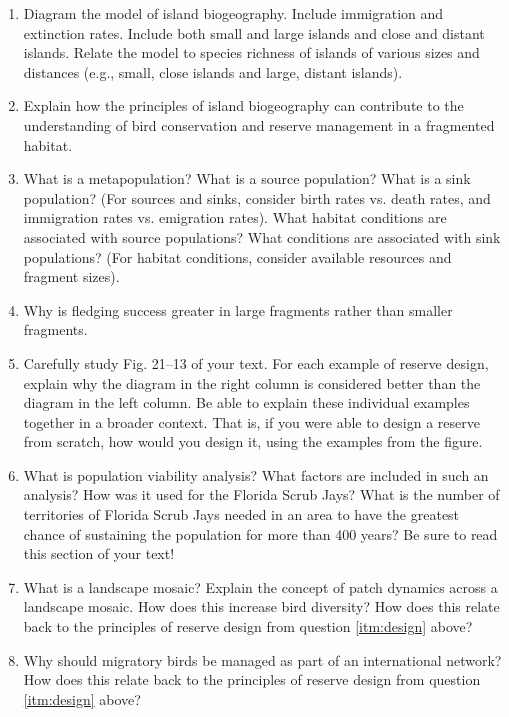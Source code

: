 \documentclass[nofonts, letterpaper]{tufte-handout}
\begin{document}
\begin{enumerate}

\item Diagram the model of island biogeography. Include immigration and extinction rates. Include both small and large islands and close and distant islands. Relate the model to species richness of islands of various sizes and distances (e.g., small, close islands and large, distant islands).

\item Explain how the principles of island biogeography can contribute to the understanding of bird conservation and reserve management in a fragmented habitat.

\item What is a metapopulation?  What is a source population?  What is a sink population?  (For sources and sinks, consider birth rates vs. death rates, and immigration rates vs. emigration rates). What habitat conditions are associated with source populations? What conditions are associated with sink populations?  (For habitat conditions, consider available resources and fragment sizes).

\item Why is fledging success greater in large fragments rather than smaller fragments.

\item \label{itm:design} Carefully study Fig. 21--13 of your text. For each example of reserve design, explain why the diagram in the right column is considered better than the diagram in the left column.  Be able to explain these individual examples together in a broader context. That is, if you were able to design a reserve from scratch, how would you design it, using the examples from the figure.

\item What is population viability analysis?  What factors are included in such an analysis? How was it used for the Florida Scrub Jays? What is the number of territories of Florida Scrub Jays needed in an area to have the greatest chance of sustaining the population for more than 400 years?  Be sure to read this section of your text!

\item What is a landscape mosaic?  Explain the concept of patch dynamics across a landscape mosaic. How does this increase bird diversity?  How does this relate back to the principles of reserve design from question \ref{itm:design} above?

\item Why should migratory birds be managed as part of an international network? How does this relate back to the principles of reserve design from question \ref{itm:design} above?

 
\end{enumerate}
\end{document}
